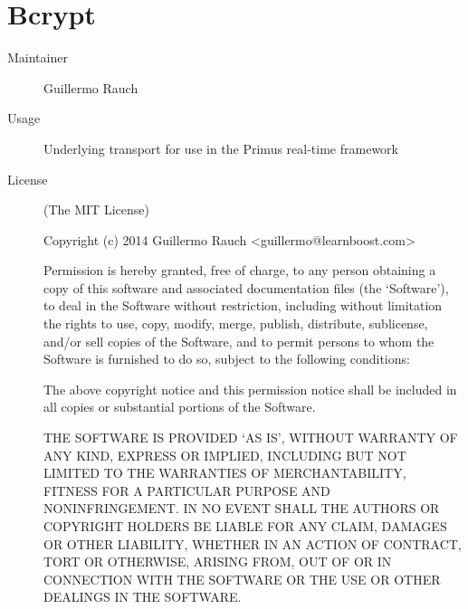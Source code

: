   \section*{Bcrypt}
    \begin{description}
      \item[Maintainer] Guillermo Rauch
      \item[Usage] Underlying transport for use in the Primus real-time framework
      \item[License] \scriptsize (The MIT License)

        Copyright (c) 2014 Guillermo Rauch <guillermo@learnboost.com>

        Permission is hereby granted, free of charge, to any person obtaining a copy of this software 
        and associated documentation files (the `Software'), to deal in the Software without restriction, 
        including without limitation the rights to use, copy, modify, merge, publish, distribute, 
        sublicense, and/or sell copies of the Software, and to permit persons to whom the Software is 
        furnished to do so, subject to the following conditions:

        The above copyright notice and this permission notice shall be included in all copies or 
        substantial portions of the Software.

        THE SOFTWARE IS PROVIDED `AS IS', WITHOUT WARRANTY OF ANY KIND, EXPRESS OR IMPLIED, INCLUDING 
        BUT NOT LIMITED TO THE WARRANTIES OF MERCHANTABILITY, FITNESS FOR A PARTICULAR PURPOSE AND 
        NONINFRINGEMENT. IN NO EVENT SHALL THE AUTHORS OR COPYRIGHT HOLDERS BE LIABLE FOR ANY CLAIM, 
        DAMAGES OR OTHER LIABILITY, WHETHER IN AN ACTION OF CONTRACT, TORT OR OTHERWISE, ARISING FROM, 
        OUT OF OR IN CONNECTION WITH THE SOFTWARE OR THE USE OR OTHER DEALINGS IN THE SOFTWARE.
    \end{description}

